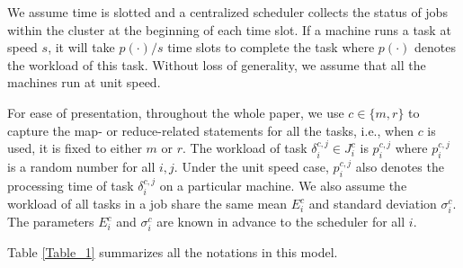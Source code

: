 \documentclass[10pt,conference,compsocconf,letterpaper]{IEEEtran}
\begin{document}
We assume time is slotted and a centralized scheduler collects the status of jobs within the cluster at the beginning of each time slot. If a machine runs a task at speed $s$, it will take $p(\cdot)/s$ time slots to complete the task where $p(\cdot)$ denotes the workload of this task.
 Without loss of generality, we assume that  all the machines run at unit speed.

For ease of presentation, throughout the whole paper, we use $c\in \{m,r\}$ to capture the map- or reduce-related statements for all the tasks, i.e., when $c$ is used, it is fixed to either $m$ or $r$. The workload of task $\delta_i^{c,j} \in J_i^c$ is $p_i^{c,j}$ where $p_i^{c,j}$ is a random number for all $i,j$. Under the unit speed case, $p_i^{c,j}$ also denotes the processing time of task $\delta_i^{c,j}$ on a particular machine. We also assume the workload of all tasks in a job share the same mean $E^c_i$ and standard deviation $\sigma^c_i$. The parameters $E^c_i$ and $\sigma^c_i$ are known in advance to the scheduler for all $i$.

Table \ref{Table_1} summarizes all the notations in this model.
\end{document}
